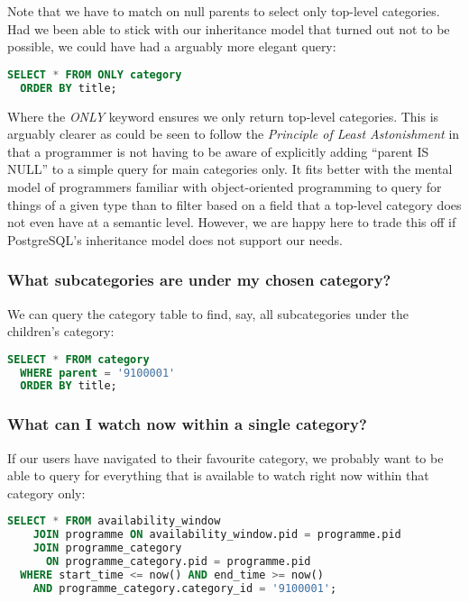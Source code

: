 \documentclass[11pt,a4paper]{article}
\begin{document}
Note that we have to match on null parents to select only
top-level categories. Had
we been able to stick with our inheritance model that turned out
not to be possible, we could have had a arguably more elegant
query:

\begin{lstlisting}[language=SQL]
  SELECT * FROM ONLY category
  ORDER BY title;
\end{lstlisting}

Where the \emph{ONLY} keyword ensures we only return top-level
categories.
This is arguably clearer as could be seen to follow the
\emph{Principle of Least Astonishment} \cite{saltzer2009principles}
in that a programmer
is not having to be aware of explicitly adding ``parent IS NULL''
to a simple query for main categories only. It fits better with
the mental model of programmers familiar with object-oriented
programming to query for things of a given type than to filter
based on a field that a top-level category does not even have
at a semantic level. However, we are happy here to trade this
off if PostgreSQL's inheritance model does not support our needs.

\subsubsection{What subcategories are under my chosen category?}

We can query the category table to find, say, all subcategories under
the children's category:

\begin{lstlisting}[language=SQL]
  SELECT * FROM category
  WHERE parent = '9100001'
  ORDER BY title;
\end{lstlisting}

\subsubsection{What can I watch now within a single category?}

If our users have navigated to their favourite category, we probably want
to be able to query for everything that is available to watch right
now within that category only:

\begin{lstlisting}[language=SQL]
  SELECT * FROM availability_window
    JOIN programme ON availability_window.pid = programme.pid
    JOIN programme_category
      ON programme_category.pid = programme.pid
  WHERE start_time <= now() AND end_time >= now()
    AND programme_category.category_id = '9100001';
\end{lstlisting}
\end{document}
